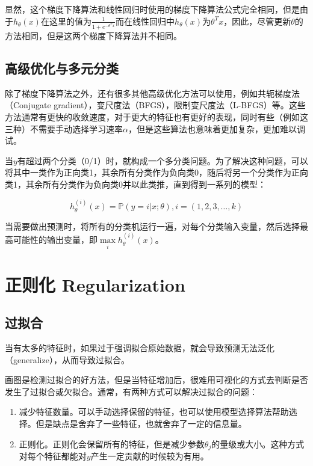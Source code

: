 \documentclass[12pt, a4paper]{article}
\begin{document}
显然，这个梯度下降算法和线性回归时使用的梯度下降算法公式完全相同，但是由于$h_\theta(x)$在这里的值为$\frac{1}{1+e^{-\theta^Tx}}$而在线性回归中$h_\theta(x)$为$\theta^Tx$，因此，尽管更新$\theta$的方法相同，但是这两个梯度下降算法并不相同。

\subsection{高级优化与多元分类}

除了梯度下降算法之外，还有很多其他高级优化方法可以使用，例如共轭梯度法（Conjugate gradient），变尺度法（BFGS），限制变尺度法（L-BFGS）等。这些方法通常有更快的收敛速度，对于更大的特征也有更好的表现，同时有些（例如这三种）不需要手动选择学习速率$\alpha$，但是这些算法也意味着更加复杂，更加难以调试。

当$y$有超过两个分类（0/1）时，就构成一个多分类问题。为了解决这种问题，可以将其中一类作为正向类1，其余所有分类作为负向类0，随后将另一个分类作为正向类1，其余所有分类作为负向类0并以此类推，直到得到一系列的模型：

\begin{equation*}
    h_\theta^{(i)}(x) = \mathbb{P}(y=i|x; \theta), i=(1,2,3,\dots,k)
\end{equation*}

当需要做出预测时，将所有的分类机运行一遍，对每个分类输入变量，然后选择最高可能性的输出变量，即$\mathop{max}\limits_ih_\theta^{(i)}(x)$。

\section{正则化 Regularization}

\subsection{过拟合}

当有太多的特征时，如果过于强调拟合原始数据，就会导致预测无法泛化（generalize），从而导致过拟合。

画图是检测过拟合的好方法，但是当特征增加后，很难用可视化的方式去判断是否发生了过拟合或欠拟合。通常，有两种方式可以解决过拟合的问题：

\begin{enumerate}
    \item 减少特征数量。可以手动选择保留的特征，也可以使用模型选择算法帮助选择。但是缺点是舍弃了一些特征，也就舍弃了一定的信息量。
    \item 正则化。正则化会保留所有的特征，但是减少参数$\theta_j$的量级或大小。这种方式对每个特征都能对$y$产生一定贡献的时候较为有用。
\end{enumerate}
\end{document}
